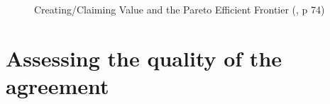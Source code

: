 \documentclass[
  ignorenonframetext,
]{beamer}
\begin{document}
\begin{frame}{}
\label{section-13}
\begin{figure}


\caption{\label{fig-creating-claiming-value-pareto-efficient-frontier}Creating/Claiming
Value and the Pareto Efficient Frontier
(, p 74)}

\end{figure}%
\end{frame}

\section{Assessing the quality of the
agreement}\label{assessing-the-quality-of-the-agreement}
\end{document}
